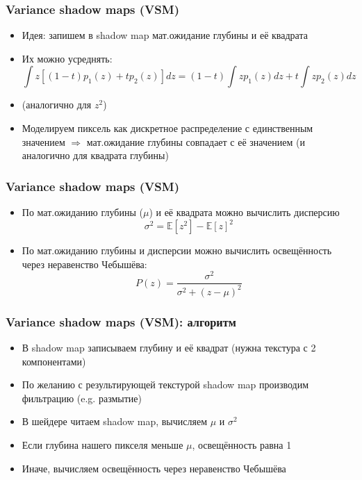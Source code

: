 \documentclass{beamer}
\begin{document}
\begin{frame}[fragile]
\frametitle{Variance shadow maps (VSM)}
\begin{itemize}
\item Идея: запишем в shadow map мат.ожидание глубины и её квадрата
\pause
\item Их можно усреднять:
\begin{equation}
\int z \left[(1-t)p_1(z) + tp_2(z)\right] dz = (1-t)\int z p_1(z) dz + t\int z p_2(z) dz
\end{equation}
\item (аналогично для \begin{math}z^2\end{math})
\pause
\item Моделируем пиксель как дискретное распределение с единственным значением \begin{math}\Rightarrow\end{math} мат.ожидание глубины совпадает с её значением (и аналогично для квадрата глубины)
\end{itemize}
\end{frame}

\begin{frame}[fragile]
\frametitle{Variance shadow maps (VSM)}
\begin{itemize}
\item По мат.ожиданию глубины (\begin{math}\mu\end{math}) и её квадрата можно вычислить дисперсию
\begin{equation}
\sigma^2 = \mathbb{E}[z^2] - \mathbb{E}[z]^2
\end{equation}
\pause
\item По мат.ожиданию глубины и дисперсии можно вычислить освещённость через неравенство Чебышёва:
\begin{equation}
P(z) = \frac{\sigma^2}{\sigma^2 + (z - \mu)^2}
\end{equation}
\end{itemize}
\end{frame}

\begin{frame}[fragile]
\frametitle{Variance shadow maps (VSM): алгоритм}
\begin{itemize}
\item В shadow map записываем глубину и её квадрат (нужна текстура с 2 компонентами)
\pause
\item По желанию с результирующей текстурой shadow map производим фильтрацию (e.g. размытие)
\pause
\item В шейдере читаем shadow map, вычисляем \begin{math}\mu\end{math} и \begin{math}\sigma^2\end{math}
\pause
\item Если глубина нашего пикселя меньше \begin{math}\mu\end{math}, освещённость равна 1
\pause
\item Иначе, вычисляем освещённость через неравенство Чебышёва
\end{itemize}
\end{frame}
\end{document}
